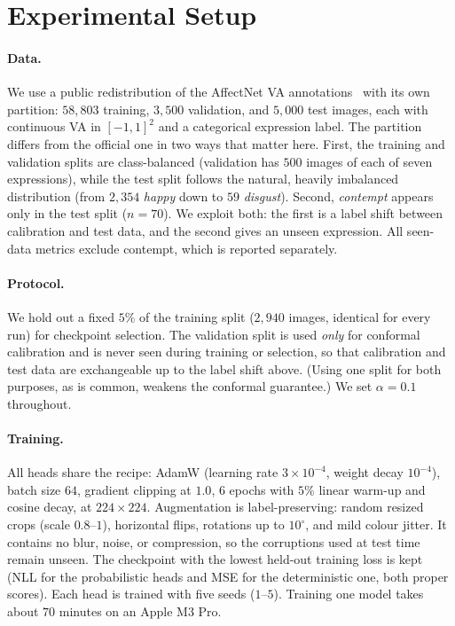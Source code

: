 \section{Experimental Setup}
\label{sec:experiments}

\paragraph{Data.} We use a public redistribution of the AffectNet VA
annotations~\cite{mollahosseini2017affectnet} with its own partition:
$58{,}803$ training, $3{,}500$ validation, and $5{,}000$ test images, each with
continuous VA in $[-1,1]^2$ and a categorical expression label. The partition
differs from the official one in two ways that matter here. First, the training
and validation splits are class-balanced (validation has $500$ images of each of
seven expressions), while the test split follows the natural, heavily imbalanced
distribution (from $2{,}354$ \emph{happy} down to $59$ \emph{disgust}). Second,
\emph{contempt} appears only in the test split ($n=70$). We exploit both: the
first is a label shift between calibration and test data, and the second gives
an unseen expression. All seen-data metrics exclude contempt, which is reported
separately.

\paragraph{Protocol.} We hold out a fixed $5\%$ of the training split
($2{,}940$ images, identical for every run) for checkpoint selection. The
validation split is used \emph{only} for conformal calibration and is never seen
during training or selection, so that calibration and test data are
exchangeable up to the label shift above. (Using one split for both purposes, as
is common, weakens the conformal guarantee.) We set $\alpha=0.1$ throughout.

\paragraph{Training.} All heads share the recipe: AdamW (learning rate
$3\times10^{-4}$, weight decay $10^{-4}$), batch size $64$, gradient clipping at
$1.0$, $6$ epochs with $5\%$ linear warm-up and cosine decay, at
$224\times224$. Augmentation is label-preserving: random resized crops (scale
$0.8$--$1$), horizontal flips, rotations up to $10^\circ$, and mild colour jitter.
It contains no blur, noise, or compression, so the corruptions used at test time
remain unseen. The checkpoint with the lowest held-out training loss is kept (NLL
for the probabilistic heads and MSE for the deterministic one, both proper
scores). Each head is trained with five seeds ($1$--$5$). Training one model
takes about $70$ minutes on an Apple M3 Pro.

